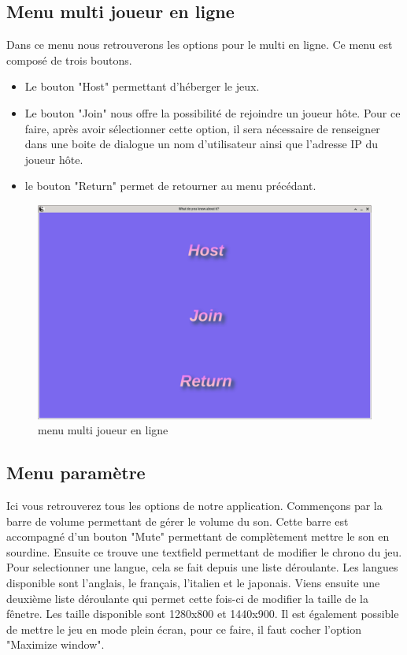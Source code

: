 \newpage
\subsection{Menu multi joueur en ligne}
Dans ce menu nous retrouverons les options pour le multi en ligne. Ce menu est composé de trois boutons.
\begin{itemize}
	\item Le bouton "Host" permettant d'héberger le jeux.
	\item Le bouton "Join" nous offre la possibilité de rejoindre un joueur hôte. Pour ce faire, après avoir 
		sélectionner cette option, il sera nécessaire de renseigner dans une boite de dialogue  un nom 
		d'utilisateur ainsi que l'adresse IP du joueur hôte.
	\item le bouton "Return" permet de retourner au menu précédant.
\end{itemize}

\begin{figure}[h]
	\centering
	\includegraphics[width=\textwidth]{menuonline.png}
	\caption{menu multi joueur en ligne}
	\label{fig:menu_multi_en_ligne}
\end{figure}

\newpage
\subsection{Menu paramètre}
Ici vous retrouverez tous les options de notre application. Commençons par la barre de volume permettant de gérer 
le volume du son. Cette barre est accompagné d'un bouton "Mute" permettant de complètement mettre le son en 
sourdine. Ensuite ce trouve une textfield permettant de modifier le chrono du jeu. Pour selectionner une langue,
cela se fait depuis une liste déroulante. Les langues disponible sont l'anglais, le français, l'italien et le 
japonais. Viens ensuite une deuxième liste déroulante qui permet cette fois-ci de modifier la taille de la fênetre. Les taille disponible sont 1280x800 et 1440x900. Il est également possible de mettre le jeu en mode plein écran, pour ce faire, il faut cocher l'option "Maximize window".

